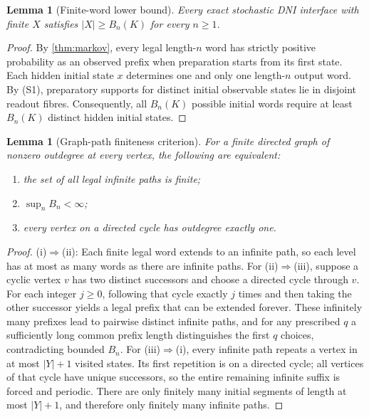 \documentclass[11pt,letterpaper]{article}
\newtheorem{lemma}[theorem]{Lemma}
\theoremstyle{definition}\newtheorem{definition}[theorem]{Definition}
\theoremstyle{remark}\newtheorem{remark}[theorem]{Remark}
\begin{document}
\begin{lemma}[Finite-word lower bound]\label{lem:lower}
Every exact stochastic DNI interface with finite $X$ satisfies $|X|\ge B_n(K)$ for every $n\ge 1$.
\end{lemma}
\begin{proof}
By \cref{thm:markov}, every legal length-$n$ word has strictly positive probability as an observed prefix when preparation starts from its first state. Each hidden initial state $x$ determines one and only one length-$n$ output word. By (S1), preparatory supports for distinct initial observable states lie in disjoint readout fibres. Consequently, all $B_n(K)$ possible initial words require at least $B_n(K)$ distinct hidden initial states.
\end{proof}
\begin{lemma}[Graph-path finiteness criterion]\label{lem:graph}
For a finite directed graph of nonzero outdegree at every vertex, the following are equivalent:
\begin{enumerate}[label=(\roman*)]
\item the set of all legal infinite paths is finite;
\item $\sup_n B_n<\infty$;
\item every vertex on a directed cycle has outdegree exactly one.
\end{enumerate}
\end{lemma}
\begin{proof}
(i)$\Rightarrow$(ii): Each finite legal word extends to an infinite path, so each level has at most as many words as there are infinite paths. For (ii)$\Rightarrow$(iii), suppose a cyclic vertex $v$ has two distinct successors and choose a directed cycle through $v$. For each integer $j\ge0$, following that cycle exactly $j$ times and then taking the other successor yields a legal prefix that can be extended forever. These infinitely many prefixes lead to pairwise distinct infinite paths, and for any prescribed $q$ a sufficiently long common prefix length distinguishes the first $q$ choices, contradicting bounded $B_n$.
For (iii)$\Rightarrow$(i), every infinite path repeats a vertex in at most $|Y|+1$ visited states. Its first repetition is on a directed cycle; all vertices of that cycle have unique successors, so the entire remaining infinite suffix is forced and periodic. There are only finitely many initial segments of length at most $|Y|+1$, and therefore only finitely many infinite paths.
\end{proof}
\end{document}
